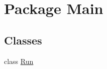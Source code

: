 \hypertarget{namespace_main}{}\section{Package Main}
\label{namespace_main}
\subsection*{Classes}
\begin{DoxyCompactItemize}
\item 
class \hyperlink{class_main_1_1_run}{Run}
\end{DoxyCompactItemize}
